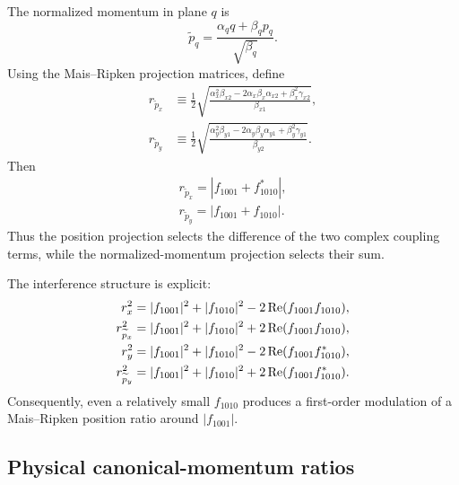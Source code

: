 The normalized momentum in plane $q$ is
\begin{equation}
 \widetilde p_q=\frac{\alpha_q q+\beta_q p_q}{\sqrt{\beta_q}}.
\end{equation}
Using the Mais--Ripken projection matrices, define
\begin{align}
 r_{\widetilde p_x}
 &\equiv\frac12
 \sqrt{
  \frac{
   \alpha_x^2\beta_{x2}
   -2\alpha_x\beta_x\alpha_{x2}
   +\beta_x^2\gamma_{x2}
  }{\beta_{x1}}
 },
 \label{eq:rpx-mr}\\
 r_{\widetilde p_y}
 &\equiv\frac12
 \sqrt{
  \frac{
   \alpha_y^2\beta_{y1}
   -2\alpha_y\beta_y\alpha_{y1}
   +\beta_y^2\gamma_{y1}
  }{\beta_{y2}}
 }.
 \label{eq:rpy-mr}
\end{align}
Then
\begin{align}
 \boxed{r_{\widetilde p_x}=|f_{1001}+f_{1010}^{*}|,}
 \label{eq:rpx-rdt}\\
 \boxed{r_{\widetilde p_y}=|f_{1001}+f_{1010}|.}
 \label{eq:rpy-rdt}
\end{align}
Thus the position projection selects the difference of the two complex coupling terms, while the normalized-momentum projection selects their sum.

The interference structure is explicit:
\begin{align}
 r_x^2&=|f_{1001}|^2+|f_{1010}|^2-2\operatorname{Re}(f_{1001}f_{1010}),\\
 r_{\widetilde p_x}^2&=|f_{1001}|^2+|f_{1010}|^2+2\operatorname{Re}(f_{1001}f_{1010}),\\
 r_y^2&=|f_{1001}|^2+|f_{1010}|^2-2\operatorname{Re}(f_{1001}f_{1010}^{*}),\\
 r_{\widetilde p_y}^2&=|f_{1001}|^2+|f_{1010}|^2+2\operatorname{Re}(f_{1001}f_{1010}^{*}).
 \label{eq:interference-identities}
\end{align}
Consequently, even a relatively small $f_{1010}$ produces a first-order modulation of a Mais--Ripken position ratio around $|f_{1001}|$.

\subsection{Physical canonical-momentum ratios}

